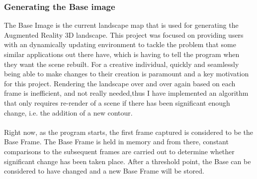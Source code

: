 \documentclass[11pt]{article}
\begin{document}
\subsubsection{Generating the Base image}
\label{sec:baseimage}
The Base Image is the current landscape map that is used for generating the
Augmented Reality 3D landscape. This project was focused on providing 
users with an dynamically updating environment to tackle the problem that
some similar applications out there have, which is having to tell the program
when they want the scene rebuilt. For a creative individual, quickly and seamlessly
being able to make changes to their creation is paramount and a key motivation
for this project. Rendering the landscape over and over again based on
each frame is inefficient, and not really needed,thus I have implemented an 
algorithm that only requires re-render of a scene if there has been significant
enough change, i.e. the addition of a new contour.\\
\\
Right now, as the program starts, the first frame captured is considered to 
be the Base Frame. The Base Frame is held in memory and from there, 
constant comparisons to the subsequent frames are carried
out to determine whether significant change has been taken place. After a
threshold point, the Base can be considered to have changed and a new Base 
Frame will be stored. 
\end{document}
